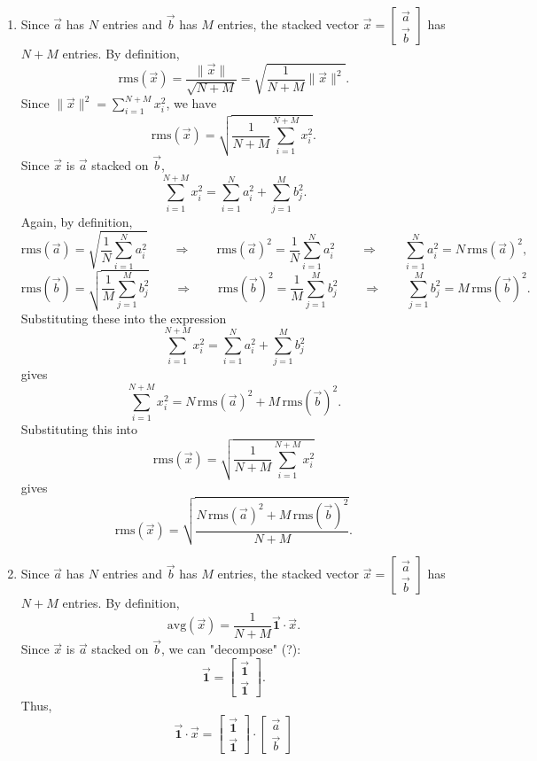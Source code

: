 \documentclass[10pt]{extarticle}
\begin{document}
\begin{enumerate}[label=(\alph*)]
\item Since $\vec{a}$ has $N$ entries and $\vec{b}$ has $M$ entries, the stacked vector $\vec{x}=\begin{bmatrix}\vec{a}\\ \vec{b}\end{bmatrix}$ has $N+M$ entries. By definition,
\[
\mathrm{rms}(\vec{x})=\frac{\|\vec{x}\|}{\sqrt{N+M}}=\sqrt{\frac{1}{N+M}\|\vec{x}\|^2}.
\]
Since $\|\vec{x}\|^2=\sum_{i=1}^{N+M}x_i^2$, we have
\[
\mathrm{rms}(\vec{x})=\sqrt{\frac{1}{N+M}\sum_{i=1}^{N+M}x_i^2}.
\]
Since $\vec{x}$ is $\vec{a}$ stacked on $\vec{b}$,
\[
\sum_{i=1}^{N+M}x_i^2=\sum_{i=1}^{N}a_i^2+\sum_{j=1}^{M}b_j^2.
\]
Again, by definition,
\[
\mathrm{rms}(\vec{a})=\sqrt{\frac{1}{N}\sum_{i=1}^{N}a_i^2}
\qquad\Rightarrow\qquad
\mathrm{rms}(\vec{a})^2=\frac{1}{N}\sum_{i=1}^{N}a_i^2
\qquad\Rightarrow\qquad
\sum_{i=1}^{N}a_i^2=N\,\mathrm{rms}(\vec{a})^2,
\]
\[
\mathrm{rms}(\vec{b})=\sqrt{\frac{1}{M}\sum_{j=1}^{M}b_j^2}
\qquad\Rightarrow\qquad
\mathrm{rms}(\vec{b})^2=\frac{1}{M}\sum_{j=1}^{M}b_j^2
\qquad\Rightarrow\qquad
\sum_{j=1}^{M}b_j^2=M\,\mathrm{rms}(\vec{b})^2.
\]
Substituting these into the expression
\[
\sum_{i=1}^{N+M}x_i^2=\sum_{i=1}^{N}a_i^2+\sum_{j=1}^{M}b_j^2
\]
gives
\[
\sum_{i=1}^{N+M}x_i^2=N\,\mathrm{rms}(\vec{a})^2+M\,\mathrm{rms}(\vec{b})^2.
\]
Substituting this into
\[
\mathrm{rms}(\vec{x})=\sqrt{\frac{1}{N+M}\sum_{i=1}^{N+M}x_i^2}
\]
gives
\[
\mathrm{rms}(\vec{x})=\sqrt{\frac{N\,\mathrm{rms}(\vec{a})^2+M\,\mathrm{rms}(\vec{b})^2}{N+M}}.
\]
\item Since $\vec{a}$ has $N$ entries and $\vec{b}$ has $M$ entries, the stacked vector $\vec{x}=\begin{bmatrix}\vec{a}\\ \vec{b}\end{bmatrix}$ has $N+M$ entries. By definition,
\[
\mathrm{avg}(\vec{x})=\frac{1}{N+M}\vec{\mathbf{1}}\cdot\vec{x}.
\]
Since $\vec{x}$ is $\vec{a}$ stacked on $\vec{b}$, we can "decompose" (?):
\[
\vec{\mathbf{1}}=\begin{bmatrix}\vec{\mathbf{1}}\\ \vec{\mathbf{1}}\end{bmatrix}.
\]
Thus,
\[
\vec{\mathbf{1}}\cdot\vec{x}
=
\begin{bmatrix}\vec{\mathbf{1}}\\ \vec{\mathbf{1}}\end{bmatrix}\cdot
\begin{bmatrix}\vec{a}\\ \vec{b}\end{bmatrix}
\]
\end{enumerate}
\end{document}

